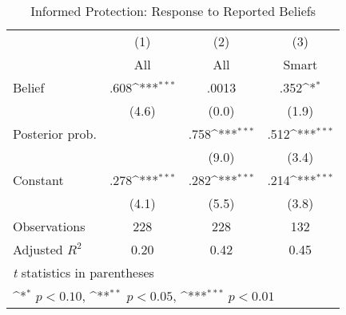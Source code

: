 \begin{table}[htbp]\centering
\def\sym#1{\ifmmode^{#1}\else\(^{#1}\)\fi}
\caption{Informed Protection: Response to Reported Beliefs}
\begin{tabular}{l*{3}{c}}
\hline\hline
                &\multicolumn{1}{c}{(1)}&\multicolumn{1}{c}{(2)}&\multicolumn{1}{c}{(3)}\\
                &\multicolumn{1}{c}{All}&\multicolumn{1}{c}{All}&\multicolumn{1}{c}{Smart}\\
\hline
Belief          &     .608\sym{***}&    .0013         &     .352\sym{*}  \\
                &    (4.6)         &    (0.0)         &    (1.9)         \\
Posterior prob. &                  &     .758\sym{***}&     .512\sym{***}\\
                &                  &    (9.0)         &    (3.4)         \\
Constant        &     .278\sym{***}&     .282\sym{***}&     .214\sym{***}\\
                &    (4.1)         &    (5.5)         &    (3.8)         \\
\hline
Observations    &      228         &      228         &      132         \\
Adjusted \(R^{2}\)&     0.20         &     0.42         &     0.45         \\
\hline\hline
\multicolumn{4}{l}{\footnotesize \textit{t} statistics in parentheses}\\
\multicolumn{4}{l}{\footnotesize \sym{*} \(p<0.10\), \sym{**} \(p<0.05\), \sym{***} \(p<0.01\)}\\
\end{tabular}
\end{table}
